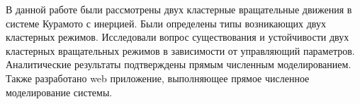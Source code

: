 В данной работе были рассмотрены двух кластерные вращательные движения 
в системе Курамото с инерцией. Были определены типы возникающих
двух кластерных режимов. Исследовали вопрос существования и
устойчивости двух кластерных вращательных режимов в зависимости
от управляющий параметров. 
Аналитические результаты подтверждены
прямым численным  моделированием. Также разработано web приложение,
выполняющее прямое численное моделирование системы.

